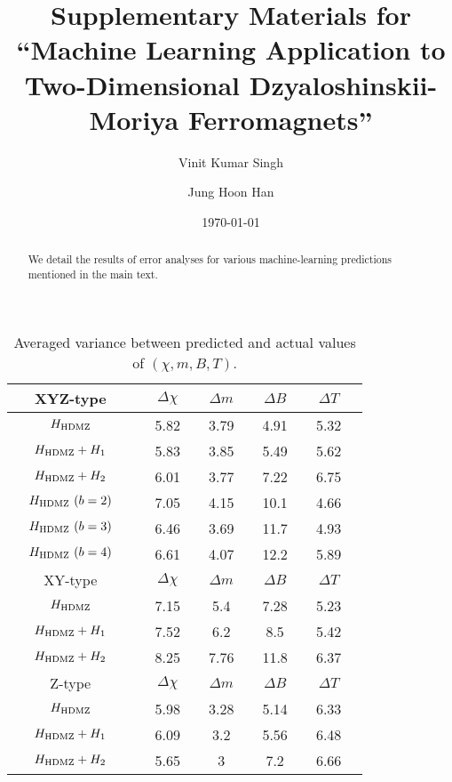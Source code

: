 \documentclass[reprint,amsmath,amssymb,aps,showpacs,twocolumn,superscriptaddress,prb]{revtex4-1}
\begin{document}
\title{Supplementary Materials for ``Machine Learning Application to Two-Dimensional Dzyaloshinskii-Moriya Ferromagnets''}

\author{Vinit Kumar Singh}
\author{Jung Hoon Han}
\date{\today}
\begin{abstract}
We detail the results of error analyses for various machine-learning predictions mentioned in the main text. 
\end{abstract}
\maketitle


\begin{table}[htb]
\begin{tabular}{ | ccc || ccc  cc  cc  cc |}
\hline
 &  XYZ-type & & & $\Delta\chi$ &  & $\Delta m$ &  & $\Delta B$ & & $\Delta T$ & \\ \hline
 &  $H_{\rm HDMZ}$ & & & 5.82 &  & 3.79 &  & 4.91 & & 5.32 & \\ \hline
 & $H_{\rm HDMZ}+ H_1$  &  & & 5.83 & & 3.85 & & 5.49 & &  5.62 & \\ \hline
 & $H_{\rm HDMZ}+ H_2$ & & & 6.01 & & 3.77 & & 7.22 & & 6.75 & \\ \hline
 & $H_{\rm HDMZ} ~ (b=2)$   & & & 7.05 & & 4.15 & & 10.1 & & 4.66 & \\ \hline
 & $H_{\rm HDMZ} ~ (b=3)$ & & & 6.46 & & 3.69 & & 11.7 & & 4.93 & \\ \hline 
 & $H_{\rm HDMZ} ~ (b=4)$ & & & 6.61 & & 4.07 & & 12.2 & & 5.89 & \\ \hline \hline
 &  XY-type & & & $\Delta\chi$ &  & $\Delta m$ &  & $\Delta B$ & & $\Delta T$ & \\ \hline
 &  $H_{\rm HDMZ}$ & & & 7.15 &  & 5.4 &  & 7.28 & & 5.23 & \\ \hline
 & $H_{\rm HDMZ}+ H_1$  &  & & 7.52 & & 6.2 & & 8.5 & &  5.42 & \\ \hline
 & $H_{\rm HDMZ}+ H_2$ & & & 8.25 & & 7.76 & & 11.8 & & 6.37 & \\ \hline \hline
 &  Z-type & & & $\Delta\chi$ &  & $\Delta m$ &  & $\Delta B$ & & $\Delta T$ & \\ \hline
 &  $H_{\rm HDMZ}$ & & & 5.98 &  & 3.28 &  & 5.14 & & 6.33 & \\ \hline
 & $H_{\rm HDMZ}+ H_1$  &  & & 6.09 & & 3.2 & & 5.56 & &  6.48 & \\ \hline
 & $H_{\rm HDMZ}+ H_2$ & & & 5.65 & & 3 & & 7.2 & & 6.66 & \\ \hline
\end{tabular}\label{table:1}
\caption{Averaged variance between predicted and actual values of $(\chi, m, B, T)$.}
\end{table}
\end{document}
